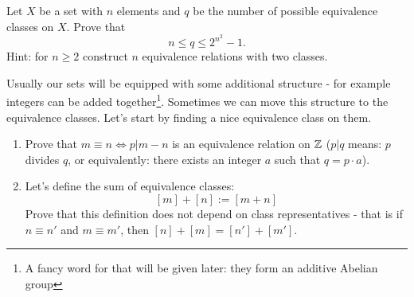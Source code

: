 \begin{exercise}
  Let $X$ be a set with $n$ elements and $q$ be the number of possible equivalence classes on $X$. Prove that $$n\le q \le 2^{n^2}-1.$$ Hint: for $n\ge 2$ construct $n$ equivalence relations with two classes.
\end{exercise}

Usually our sets will be equipped with some additional structure - for example integers can be added together\footnote{A fancy word for that will be given later: they form an additive Abelian group}. Sometimes we can move this structure to the equivalence classes. Let's start by finding a nice equivalence class on them.

\begin{exercise}
  \begin{enumerate}
    \item Prove that $m\equiv n\Leftrightarrow p|m-n$ is an equivalence relation on $\mathbb Z$ ($p|q$ means: $p$ divides $q$, or equivalently: there exists an integer $a$ such that $q=p\cdot a$).
    \item Let's define the sum of equivalence classes:
      $$[m]+[n] := [m+n]$$
      Prove that this definition does not depend on class representatives - that is if $n\equiv n'$ and $m\equiv m'$, then $[n]+[m]=[n']+[m']$.
  \end{enumerate}
\end{exercise}


